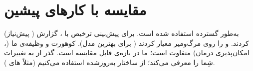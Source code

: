 \section{مقایسه با کارهای پیشین }

 (پیش‌نیاز ) به‌طور گسترده استفاده شده است.  برای پیش‌بینی ترخیص با ،   گزارش کردند.   و  را روی مرگ‌ومیر معیار کردند (  برای بهترین مدل). کوهورت و وظیفه‌ی ما (، امکان‌پذیری درمان) متفاوت است؛   ما در بازه‌ی قابل مقایسه است. گذر از  به  تغییرات شِما را معرفی می‌کند؛ از ساختار به‌روزشده استفاده می‌کنیم (مثلاً های \texttt{}).
